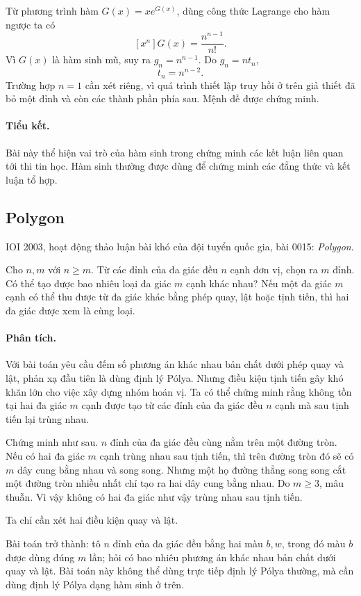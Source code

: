 \documentclass[11pt]{article}
\begin{document}
Từ phương trình hàm \(G(x)=xe^{G(x)}\), dùng công thức Lagrange cho hàm ngược
ta có
\[
  [x^n]G(x)=\frac{n^{n-1}}{n!}.
\]
Vì \(G(x)\) là hàm sinh mũ, suy ra \(g_n=n^{n-1}\). Do \(g_n=nt_n\),
\[
  t_n=n^{n-2}.
\]
Trường hợp \(n=1\) cần xét riêng, vì quá trình thiết lập truy hồi ở trên giả
thiết đã bỏ một đỉnh và còn các thành phần phía sau. Mệnh đề được chứng minh.

\paragraph{Tiểu kết.}
Bài này thể hiện vai trò của hàm sinh trong chứng minh các kết luận liên quan
tới thi tin học. Hàm sinh thường được dùng để chứng minh các đẳng thức và kết
luận tổ hợp.

\subsection{Polygon}

IOI 2003, hoạt động thảo luận bài khó của đội tuyển quốc gia, bài 0015:
\textit{Polygon}.

Cho \(n,m\) với \(n\ge m\). Từ các đỉnh của đa giác đều \(n\) cạnh đơn vị,
chọn ra \(m\) đỉnh. Có thể tạo được bao nhiêu loại đa giác \(m\) cạnh khác
nhau? Nếu một đa giác \(m\) cạnh có thể thu được từ đa giác khác bằng phép
quay, lật hoặc tịnh tiến, thì hai đa giác được xem là cùng loại.

\paragraph{Phân tích.}
Với bài toán yêu cầu đếm số phương án khác nhau bản chất dưới phép quay và
lật, phản xạ đầu tiên là dùng định lý Pólya. Nhưng điều kiện tịnh tiến gây
khó khăn lớn cho việc xây dựng nhóm hoán vị. Ta có thể chứng minh rằng không
tồn tại hai đa giác \(m\) cạnh được tạo từ các đỉnh của đa giác đều \(n\)
cạnh mà sau tịnh tiến lại trùng nhau.

Chứng minh như sau. \(n\) đỉnh của đa giác đều cùng nằm trên một đường tròn.
Nếu có hai đa giác \(m\) cạnh trùng nhau sau tịnh tiến, thì trên đường tròn
đó sẽ có \(m\) dây cung bằng nhau và song song. Nhưng một họ đường thẳng song
song cắt một đường tròn nhiều nhất chỉ tạo ra hai dây cung bằng nhau. Do
\(m\ge3\), mâu thuẫn. Vì vậy không có hai đa giác như vậy trùng nhau sau tịnh
tiến.

Ta chỉ cần xét hai điều kiện quay và lật.

Bài toán trở thành: tô \(n\) đỉnh của đa giác đều bằng hai màu \(b,w\), trong
đó màu \(b\) được dùng đúng \(m\) lần; hỏi có bao nhiêu phương án khác nhau
bản chất dưới quay và lật. Bài toán này không thể dùng trực tiếp định lý
Pólya thường, mà cần dùng định lý Pólya dạng hàm sinh ở trên.
\end{document}
